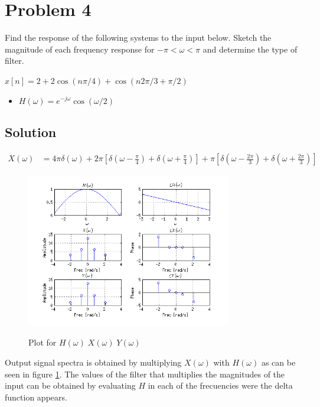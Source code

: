 \section*{Problem 4}

Find the response of the following systems to the input below. 
Sketch the magnitude of each frequency
response for $-\pi< \omega <\pi$ and determine the type of filter.

$x[n] = 2 + 2\cos(n \pi/4) + \cos(n 2\pi /3 + \pi/2)$

\begin{itemize}
\item $H(\omega) = e^{-j \omega} \cos(\omega/2)$
\end{itemize} 
\subsection*{Solution}

\begin{equation*}
\begin{aligned}
X(\omega) &= 4\pi \delta(\omega) + 
	2 \pi [\delta(\omega - \frac{\pi}{4}) + \delta(\omega + \frac{\pi}{4})] +
	  \pi [\delta(\omega - \frac{2 \pi}{3}) + \delta(\omega + \frac{2 \pi}{3})]
\end{aligned}
\end{equation*} 


\begin{figure}[H]
\caption{Plot for $H(\omega)\; X(\omega)\; Y(\omega)$}
\centering
\includegraphics[width=0.8\textwidth]{figs/c4p4a.png}
\label{fig:c4p4a}
\end{figure} 

Output signal spectra is obtained by multiplying $X(\omega)$ with $H(\omega)$ as
can be seen in figure \ref{fig:c4p4a}. The values of the filter that multiplies
the magnitudes of the input can be obtained by evaluating $H$ in each of 
the frecuencies were the delta function appears.

